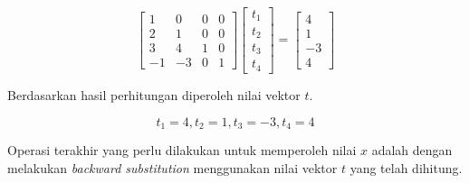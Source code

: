 \documentclass[
]{book}
\theoremstyle{definition}
\theoremstyle{definition}
\theoremstyle{definition}
\theoremstyle{definition}
\theoremstyle{remark}
\begin{document}
\begin{equation*}
\begin{bmatrix}
      1         & 0       & 0       & 0           \\[0.3em]
      2         & 1       & 0       & 0           \\[0.3em]
      3         & 4       & 1       & 0           \\[0.3em]
      -1        & -3      & 0       & 1
     \end{bmatrix}
\begin{bmatrix}
     t_1                                          \\[0.3em]
     t_2                                          \\[0.3em]
     t_3                                          \\[0.3em]
     t_4                                       
     \end{bmatrix}
= \begin{bmatrix}
     4                                          \\[0.3em]
     1                                          \\[0.3em]
     -3                                          \\[0.3em]
     4                                       
     \end{bmatrix}
\end{equation*}

Berdasarkan hasil perhitungan diperoleh nilai vektor \(t\).

\[
t_1=4, t_2=1, t_3=-3, t_4=4
\]

Operasi terakhir yang perlu dilakukan untuk memperoleh nilai \(x\) adalah dengan melakukan \emph{backward substitution} menggunakan nilai vektor \(t\) yang telah dihitung.
\end{document}
